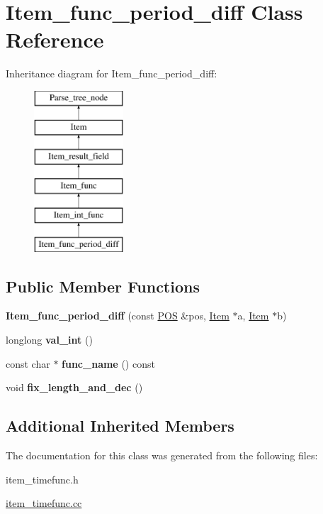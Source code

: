 \hypertarget{classItem__func__period__diff}{}\section{Item\+\_\+func\+\_\+period\+\_\+diff Class Reference}
\label{classItem__func__period__diff}
Inheritance diagram for Item\+\_\+func\+\_\+period\+\_\+diff\+:\begin{figure}[H]
\begin{center}
\leavevmode
\includegraphics[height=6.000000cm]{classItem__func__period__diff}
\end{center}
\end{figure}
\subsection*{Public Member Functions}
\begin{DoxyCompactItemize}
\item 
\mbox{\label{classItem__func__period__diff_a80bdd0eb4083e003f63e145b2e7e6b7f}} 
{\bfseries Item\+\_\+func\+\_\+period\+\_\+diff} (const \mbox{\hyperlink{structYYLTYPE}{P\+OS}} \&pos, \mbox{\hyperlink{classItem}{Item}} $\ast$a, \mbox{\hyperlink{classItem}{Item}} $\ast$b)
\item 
\mbox{\label{classItem__func__period__diff_a9697c837f29d7ba82d7aad2a4f10d498}} 
longlong {\bfseries val\+\_\+int} ()
\item 
\mbox{\label{classItem__func__period__diff_ad18f3fa15e28a5763c93989d3bcd22f1}} 
const char $\ast$ {\bfseries func\+\_\+name} () const
\item 
\mbox{\label{classItem__func__period__diff_a0bd5e31737bfdf22ec206cbce127a571}} 
void {\bfseries fix\+\_\+length\+\_\+and\+\_\+dec} ()
\end{DoxyCompactItemize}
\subsection*{Additional Inherited Members}


The documentation for this class was generated from the following files\+:\begin{DoxyCompactItemize}
\item 
item\+\_\+timefunc.\+h\item 
\mbox{\hyperlink{item__timefunc_8cc}{item\+\_\+timefunc.\+cc}}\end{DoxyCompactItemize}
